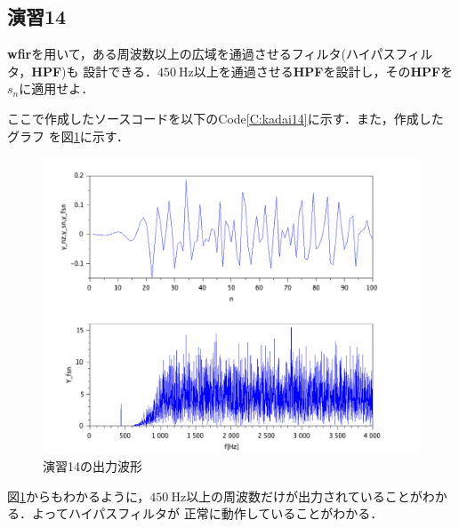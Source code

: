 \documentclass[a4paper,11pt]{jsarticle}
\begin{document}
\subsection{演習14}
\begin{screen}
  \textbf{wfir}を用いて，ある周波数以上の広域を通過させるフィルタ(ハイパスフィルタ，\textbf{HPF})も
  設計できる．$\SI{450}{\hertz}$以上を通過させる\textbf{HPF}を設計し，その\textbf{HPF}を$s_n$に適用せよ．
\end{screen}
ここで作成したソースコードを以下のCode\ref{C:kadai14}に示す．また，作成したグラフ
を図\ref{G:kadai14}に示す．

\begin{figure}[H]
  \centering
  \includegraphics[width=0.8\linewidth]{picture/kadai14.png}
  \caption{演習14の出力波形}
  \label{G:kadai14}
\end{figure}
図\ref{G:kadai14}からもわかるように，$\SI{450}{\hertz}$以上の周波数だけが出力されていることがわかる．よってハイパスフィルタが
正常に動作していることがわかる．
\end{document}
